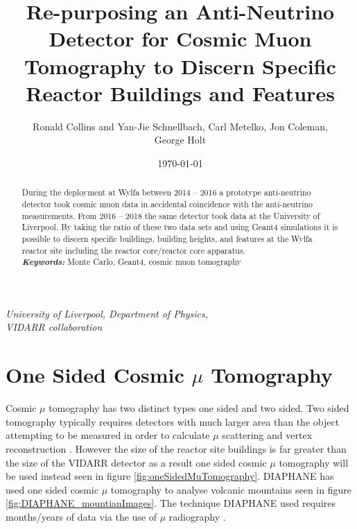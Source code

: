 \documentclass[12pt,a4paper]{article}
\title{Re-purposing an Anti-Neutrino Detector for Cosmic Muon Tomography to Discern Specific Reactor Buildings and Features}
\date{\today}
\author{Ronald Collins and Yan-Jie Schnellbach, Carl Metelko, Jon Coleman, \\George Holt}
\begin{document}
\maketitle


\begin{center}
\textit{University of Liverpool, Department of Physics,\\}
\textit{VIDARR collaboration\\}
\end{center}
 

\begin{abstract}
\normalsize During the deployment at Wylfa between 2014 -- 2016 a prototype anti-neutrino detector took cosmic muon data in accidental coincidence with the anti-neutrino measurements. From 2016 -- 2018 the same detector took data at the University of Liverpool. By taking the ratio of these two data sets and using Geant4 simulations it is possible to discern specific buildings, building heights, and features at the Wylfa reactor site including the reactor core/reactor core apparatus.\\

\providecommand{\keywords}[1]{\textbf{\textit{Keywords:}} #1} %
\keywords{Monte Carlo, Geant4, cosmic muon tomography}
\end{abstract}
\vspace{5mm} %



\section{One Sided Cosmic $\mu$ Tomography}
Cosmic $\mu$ tomography has two distinct types one sided and two sided. Two sided tomography typically requires detectors with much larger area than the object attempting to be measured in order to calculate $\mu$ scattering and vertex reconstruction \cite{schultz_2007}. However the size of the reactor site buildings is far greater than the size of the VIDARR detector as a result one sided cosmic $\mu$ tomography will be used instead seen in figure \ref{fig:oneSidedMuTomography}. DIAPHANE has used one sided cosmic $\mu$ tomography to analyse volcanic mountains seen in figure \ref{fig:DIAPHANE_mountianImages}. The technique DIAPHANE used requires months/years of data via the use of $\mu$ radiography \cite{Marteau_2017}. 
\end{document}

